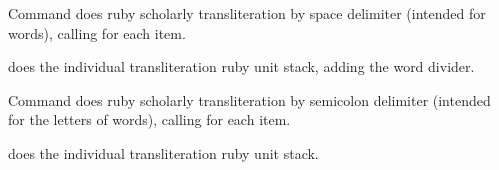 \documentclass{article}
\begin{document}
Command \cs{\sugrubyw} does ruby scholarly transliteration by space delimiter (intended for words), calling \cs{\smaprubyw} for each item.

\cs{\smaprubyw} does the individual transliteration ruby unit stack, adding the word divider.



\bigskip
Command \cs{\sugruby} does ruby scholarly transliteration by semicolon delimiter (intended for the letters of words), calling \cs{\smapruby} for each item.

\cs{\smapruby} does the individual transliteration ruby unit stack.


\end{document}
